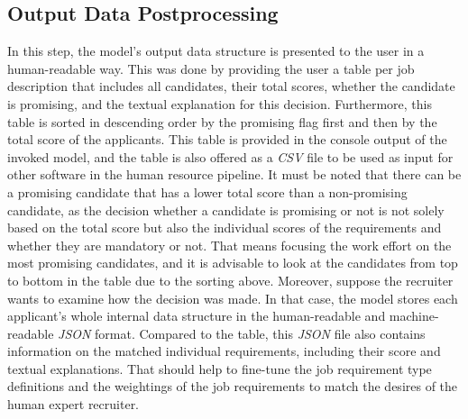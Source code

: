 \documentclass[draft,final]{thesisclass} %
\begin{document}
\subsection{Output Data Postprocessing}
In this step, the model's output data structure is presented to the user in a human-readable way.
This was done by providing the user a table per job description that includes all candidates, their total scores, whether the candidate is promising, and the textual explanation for this decision.
Furthermore, this table is sorted in descending order by the promising flag first and then by the total score of the applicants.
This table is provided in the console output of the invoked model, and the table is also offered as a \textit{CSV} file to be used as input for other software in the human resource pipeline.
It must be noted that there can be a promising candidate that has a lower total score than a non-promising candidate, as the decision whether a candidate is promising or not is not solely based on the total score but also the individual scores of the requirements and whether they are mandatory or not.
That means focusing the work effort on the most promising candidates, and it is advisable to look at the candidates from top to bottom in the table due to the sorting above.
Moreover, suppose the recruiter wants to examine how the decision was made. In that case, the model stores each applicant's whole internal data structure in the human-readable and machine-readable \textit{JSON} format.
Compared to the table, this \textit{JSON} file also contains information on the matched individual requirements, including their score and textual explanations.
That should help to fine-tune the job requirement type definitions and the weightings of the job requirements to match the desires of the human expert recruiter. 
\end{document}
